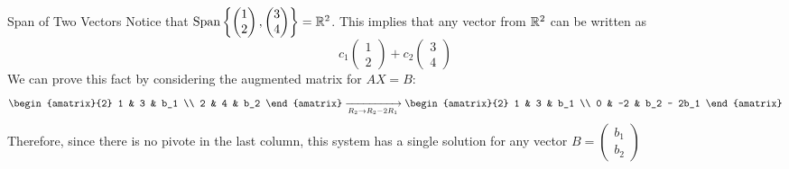 \begin{example}{Span of Two Vectors}{}
    Notice that $\text{Span}\left\{\begin{pmatrix} 1 \\ 2\end{pmatrix}, \begin{pmatrix} 3 \\ 4\end{pmatrix} \right\} = \mathbb R^{2}$. This implies that any vector from $\mathbb R^{2}$ can be written as 
    \[ c_1\begin{pmatrix} 1 \\ 2 \end{pmatrix} + c_2\begin{pmatrix} 3 \\ 4\end{pmatrix}\]
    We can prove this fact by considering the augmented matrix for $AX=B$:
    \[ 
        \begin{amatrix}{2}
           1 & 3 & b_1 \\
           2 & 4 & b_2  
        \end{amatrix}
        \xrightarrow[R_2 \to R_2 - 2R_1]{} 
        \begin{amatrix}{2}
            1 & 3 & b_1 \\
            0 & -2 & b_2 - 2b_1
        \end{amatrix}
    \]
    Therefore, since there is no pivote in the last column, this system has a single solution for any vector $B = \begin{pmatrix} b_1 \\ b_2 \end{pmatrix}$
\end{example}

